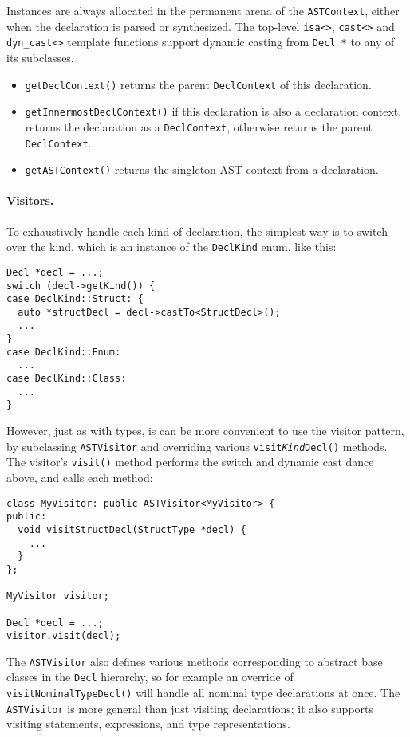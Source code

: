 \documentclass[../generics]{subfiles}
\begin{document}
Instances are always allocated in the permanent arena of the \texttt{ASTContext}, either when the declaration is parsed or synthesized. The top-level \verb|isa<>|, \verb|cast<>| and \verb|dyn_cast<>| template functions support dynamic casting from \texttt{Decl *} to any of its subclasses.
\begin{itemize}
\item \texttt{getDeclContext()} returns the parent \texttt{DeclContext} of this declaration.
\item \texttt{getInnermostDeclContext()} if this declaration is also a declaration context, returns the declaration as a \texttt{DeclContext}, otherwise returns the parent \texttt{DeclContext}.
\item \texttt{getASTContext()} returns the singleton AST context from a declaration.
\end{itemize}

\paragraph{Visitors.}
To exhaustively handle each kind of declaration, the simplest way is to switch over the kind, which is an instance of the \texttt{DeclKind} enum, like this:
\begin{Verbatim}
Decl *decl = ...;
switch (decl->getKind()) {
case DeclKind::Struct: {
  auto *structDecl = decl->castTo<StructDecl>();
  ...
}
case DeclKind::Enum:
  ...
case DeclKind::Class:
  ...
}
\end{Verbatim}
However, just as with types, is can be more convenient to use the visitor pattern, by subclassing \texttt{ASTVisitor} and overriding various \texttt{visit\emph{Kind}Decl()} methods. The visitor's \texttt{visit()} method performs the switch and dynamic cast dance above, and calls each method:
\begin{Verbatim}
class MyVisitor: public ASTVisitor<MyVisitor> {
public:
  void visitStructDecl(StructType *decl) {
    ...
  }
};

MyVisitor visitor;

Decl *decl = ...;
visitor.visit(decl);
\end{Verbatim}
The \texttt{ASTVisitor} also defines various methods corresponding to abstract base classes in the \texttt{Decl} hierarchy, so for example an override of \texttt{visitNominalTypeDecl()} will handle all nominal type declarations at once. The \texttt{ASTVisitor} is more general than just visiting declarations; it also supports visiting statements, expressions, and type representations.
\end{document}
